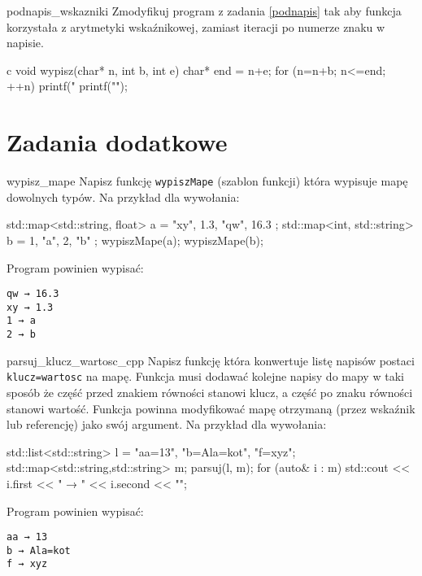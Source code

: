 \documentclass{pdfBooklets}
\begin{document}
\begin{Zadanie}{}{podnapis_wskazniki}
Zmodyfikuj program z zadania \ref{podnapis} tak aby funkcja korzystała z arytmetyki wskaźnikowej, zamiast iteracji po numerze znaku w napisie.

\begin{rozwiazanie}{c}
void wypisz(char* n, int b, int e) {
	char* end = n+e;
	for (n=n+b; n<=end; ++n)
		printf("%
	printf("\n");
}
\end{rozwiazanie}
\end{Zadanie}

\section{Zadania dodatkowe}

\begin{Zadanie}{}{wypisz_mape}
Napisz funkcję \Verb#wypiszMape# (szablon funkcji) która wypisuje mapę dowolnych typów. Na przykład dla wywołania:
\begin{CodeFrame*}[cpp]{}
std::map<std::string, float> a = { {"xy", 1.3}, {"qw", 16.3} };
std::map<int, std::string> b = { {1, "a"}, {2, "b"} };
wypiszMape(a);
wypiszMape(b);
\end{CodeFrame*}
\vspace{-8pt}Program powinien wypisać:
\vspace{-8pt}\begin{Verbatim}
qw → 16.3
xy → 1.3
1 → a
2 → b
\end{Verbatim}
\end{Zadanie}

\begin{Zadanie}{}{parsuj_klucz_wartosc_cpp}
Napisz funkcję która konwertuje listę napisów postaci \Verb#klucz=wartosc# na mapę.
Funkcja musi dodawać kolejne napisy do mapy w taki sposób że część przed znakiem równości stanowi klucz, a część po znaku równości stanowi wartość.
Funkcja powinna modyfikować mapę otrzymaną (przez wskaźnik lub referencję) jako swój argument. Na przykład dla wywołania:
\begin{CodeFrame*}[cpp]{}
std::list<std::string> l = {"aa=13", "b=Ala=kot", "f=xyz"};
std::map<std::string,std::string> m;
parsuj(l, m);
for (auto& i : m)  std::cout << i.first << " → " << i.second << "\n";
\end{CodeFrame*}
\vspace{-8pt}Program powinien wypisać:
\vspace{-8pt}\begin{Verbatim}
aa → 13
b → Ala=kot
f → xyz
\end{Verbatim}
\end{Zadanie}
\end{document}
